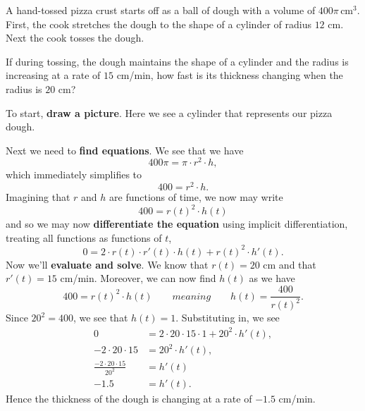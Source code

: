 \documentclass{ximera}
\begin{document}
\begin{example}
A hand-tossed pizza crust starts off as a ball of dough with a volume
of $400\pi\, \text{cm}^3$. First, the cook stretches the dough to the
shape of a cylinder of radius $12$ cm. Next the cook tosses the
dough.

If during tossing, the dough maintains the shape of a cylinder and the
radius is increasing at a rate of $15$ cm/min, how fast is its
thickness changing when the radius is $20$ cm?
\begin{explanation}
  To start, \textbf{draw a picture}. Here we see a cylinder that
  represents our pizza dough.
  \begin{image}
  \end{image}
  Next we need to \textbf{find equations}. We see that we have
  \[
  400\pi = \pi \cdot r^2 \cdot h,
  \]
  which immediately simplifies to
  \[
  400 = r^2 \cdot h.
  \]
  Imagining that $r$ and $h$ are functions of time, we now may write
  \[
  400 = r(t)^2 \cdot h(t)
  \]
  and so we may now \textbf{differentiate the equation} using implicit
  differentiation, treating all functions as functions of $t$,
  \[
  0 = 2\cdot r(t) \cdot r'(t) \cdot h(t) + r(t)^2 \cdot h'(t).
  \]
  Now we'll \textbf{evaluate and solve}. We know that $r(t) = 20$ cm
  and that $r'(t) = 15$ cm/min. Moreover, we can now find $h(t)$ as we have
  \[
  400 = r(t)^2 \cdot h(t) \qquad{meaning}\qquad h(t) = \frac{400}{r(t)^2}.
  \]
  Since $20^2 = 400$, we see that $h(t) = 1$. Substituting in, we see
  \begin{align*}
    0 &= 2\cdot 20 \cdot 15 \cdot 1 + 20^2 \cdot h'(t),\\
    -2\cdot 20 \cdot 15  &= 20^2 \cdot h'(t),\\
    \frac{-2\cdot 20 \cdot 15}{20^2}  &= h'(t)\\
    -1.5  &= h'(t).
  \end{align*}
  Hence the thickness of the dough is changing at a rate of $-1.5$
  cm/min.
\end{explanation}
\end{example}
\end{document}
